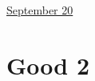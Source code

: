 \documentclass[11pt,letterpaper]{article}
\begin{document}
\href{run:2025-09-20-2.tex}{\Huge September 20} %

\section*{Good 2}


 
\end{document}
